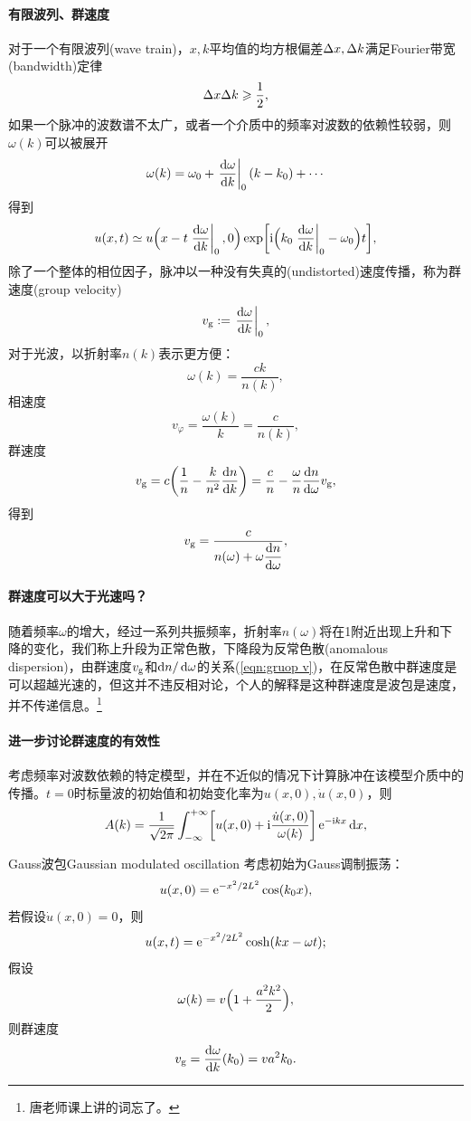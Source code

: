 \paragraph{有限波列、群速度}
对于一个有限波列(wave train)，$x,k$平均值的均方根偏差$\Delta x,\Delta k$满足Fourier带宽(bandwidth)定律
\begin{equation}
    \Delta x\Delta k\geqslant\frac12,
\end{equation}
如果一个脉冲的波数谱不太广，或者一个介质中的频率对波数的依赖性较弱，则$\omega(k)$可以被展开
\[
    \omega(k)=\omega_0+\left.\frac{\mathrm{d}^{\;\!\!}\omega}{\mathrm{d} k^{\;\!\!}}\right\rvert_0(k-k_0)+\cdots
\]
得到 
\[
    u(x,t)\simeq u\Bigkh{x-t\edg{\dv\omega k}_0,0}\exp\biggfkh{\i\Bigkh{k_0\edg{\dv\omega k}_0-\omega_0}t},
\]
除了一个整体的相位因子，脉冲以一种没有失真的(undistorted)速度传播，称为群速度(group velocity)
\begin{equation}
    v_\text g:=\left.\frac{\mathrm{d}^{\;\!\!}\omega}{\mathrm{d} k^{\;\!\!}}\right\rvert_0,
\end{equation}
对于光波，以折射率$n(k)$表示更方便：
\[
    \omega(k)=\frac{ck}{n(k)},
\]
相速度
\[
    v_\varphi=\frac{\omega(k)}k=\frac c{n(k)},
\]
群速度
\[
    v_\text g=c\biggkh{\frac1n-\frac k{n^2}\dv nk}=\frac cn-\frac\omega n\dv n\omega v_\text g,
\]
得到 
\begin{equation}
    \label{eqn:gruop v}
    v_\text g=\frac c{\displaystyle n(\omega)+\omega\frac{\mathrm{d}^{\;\!\!}n}{\mathrm{d} \omega^{\;\!\!}}},
\end{equation}
\paragraph{群速度可以大于光速吗？}
随着频率$\omega$的增大，经过一系列共振频率，折射率$n(\omega)$将在1附近出现上升和下降的变化，我们称上升段为正常色散，下降段为反常色散(anomalous dispersion)，由群速度$v_\text g$和$\mathop{}\!\mathrm{d} n/\mathop{}\!\mathrm{d}\omega$的关系(\ref{eqn:gruop v})，在反常色散中群速度是可以超越光速的，但这并不违反相对论，个人的解释是这种群速度是波包是速度，并不传递信息。\footnote{唐老师课上讲的词忘了。}
\paragraph{进一步讨论群速度的有效性}
考虑频率对波数依赖的特定模型，并在不近似的情况下计算脉冲在该模型介质中的传播。$t=0$时标量波的初始值和初始变化率为$u(x,0),\dot u(x,0)$，则 
\[
    A(k)=\frac1{\sqrt{2\pi}}\int_{-\infty}^{+\infty}\biggl[u(x,0)+\mathrm{i}\frac{\dot u(x,0)}{\omega(k)}\biggr]\mathop{}\!\mathrm{e}^{-\mathrm{i} kx}\mathop{}\!\mathrm{d} x,
\]
\begin{example}{Gauss波包}{Gaussian modulated oscillation}
    考虑初始为Gauss调制振荡：
    \[
        u(x,0)=\mathop{}\!\mathrm{e}^{-x^2/2L^2}\cos(k_0x),
    \]
    若假设$\dot u(x,0)=0$，则
    \[
        u(x,t)=\mathop{}\!\mathrm{e}^{-x^2/2L^2}\cosh(kx-\omega t);
    \]
    \tcblower
    假设 
    \[
        \omega(k)=v\Bigl(1+\frac{a^2k^2}2\Bigr),
    \]
    则群速度
    \[
        v_\text g=\frac{\mathrm{d}^{\;\!\!}\omega}{\mathrm{d} k^{\;\!\!}}(k_0)=va^2k_0.
    \]
\end{example}
